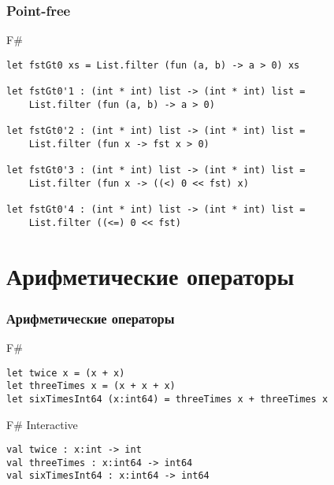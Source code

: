 \documentclass[xetex,mathserif,serif]{beamer}
\begin{document}
	\begin{frame}[fragile]
		\frametitle{Point-free}
		\begin{exampleblock}{F\#}
			\begin{lstlisting}
let fstGt0 xs = List.filter (fun (a, b) -> a > 0) xs

let fstGt0'1 : (int * int) list -> (int * int) list = 
    List.filter (fun (a, b) -> a > 0)

let fstGt0'2 : (int * int) list -> (int * int) list = 
    List.filter (fun x -> fst x > 0)

let fstGt0'3 : (int * int) list -> (int * int) list = 
    List.filter (fun x -> ((<) 0 << fst) x)

let fstGt0'4 : (int * int) list -> (int * int) list = 
    List.filter ((<=) 0 << fst)
\end{lstlisting}
\end{exampleblock}
\end{frame}

	\section{Арифметические операторы}

	\begin{frame}[fragile]
		\frametitle{Арифметические операторы}
		\begin{exampleblock}{F\#}
			\begin{lstlisting}
let twice x = (x + x)
let threeTimes x = (x + x + x)
let sixTimesInt64 (x:int64) = threeTimes x + threeTimes x
\end{lstlisting}
\end{exampleblock}

\begin{alertblock}{F\# Interactive}
\begin{lstlisting}[keywordstyle=\color{black}]
val twice : x:int -> int
val threeTimes : x:int64 -> int64
val sixTimesInt64 : x:int64 -> int64
\end{lstlisting}
\end{alertblock}
\end{frame}
\end{document}
